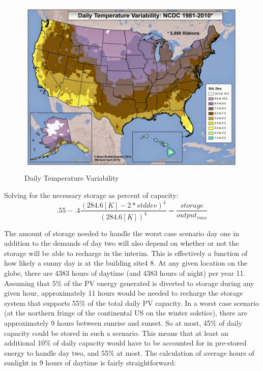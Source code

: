 \begin{figure}
\begin{center}
\includegraphics[scale=0.6]{pics/PatrickFigure3.png}
\caption{Daily Temperature Variability}
\label{p3}
\end{center}
\end{figure}

Solving for the necessary storage as percent of capacity:
\begin{equation}
.55-.4\frac{(284.6[K]-2*stddev)^4}{(284.6[K])^4}=\frac{storage}{output_{max}}
\end{equation}

The amount of storage needed to handle the worst case scenario day one in
addition to the demands of day two will also depend on whether or not the
storage will be able to recharge in the interim. This is effectively a function
of how likely a sunny day is at the building site\cite{patrick}{4} \cite{patrick}{8}. At any given location on the
globe, there are 4383 hours of daytime (and 4383 hours of night) per year \cite{patrick}{11}.
Assuming that 5\% of the PV energy generated is diverted to storage during any
given hour, approximately 11 hours would be needed to recharge the storage
system that supports 55\% of the total daily PV capacity. In a worst case scenario
(at the northern fringe of the continental US on the winter solstice), there
are approximately 9 hours between sunrise and sunset. So at most, 45\% of daily
capacity could be stored in such a scenario. This means that at least an
additional 10\% of daily capacity would have to be accounted for in pre-stored
energy to handle day two, and 55\% at most. The calculation of average hours 
of sunlight in 9 hours of daytime is fairly straightforward:

